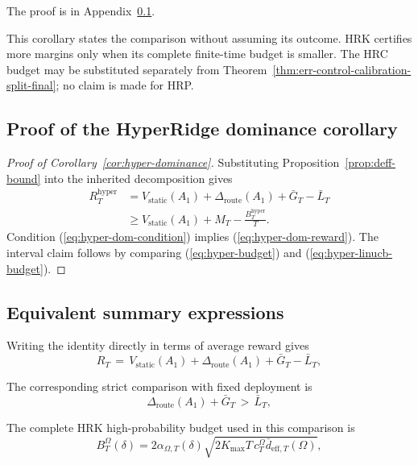 \documentclass{article} %
\renewcommand{\eqref}[1]{\textup{(\ref{#1})}}
\begin{document}
The proof is in Appendix~\ref{app:proof-hyper-dominance}.

This corollary states the comparison without assuming its outcome. HRK certifies more margins only when its complete finite-time budget is smaller. The HRC budget may be substituted separately from Theorem~\ref{thm:err-control-calibration-split-final}; no claim is made for HRP.

\subsection{Proof of the HyperRidge dominance corollary}
\label{app:proof-hyper-dominance}

\begin{proof}[Proof of Corollary~\ref{cor:hyper-dominance}]
Substituting Proposition~\ref{prop:deff-bound} into the inherited decomposition gives
\begin{equation}
\label{eq:hyper-cor-proof}
\begin{aligned}
R_T^{\mathrm{hyper}}
&=
V_{\mathrm{static}}(A_1)
+
\Delta_{\mathrm{route}}(A_1)
+
\bar G_T
-
\bar L_T
\\
&\ge
V_{\mathrm{static}}(A_1)
+
M_T
-
\frac{B_T^{\mathrm{hyper}}}{T}.
\end{aligned}
\end{equation}
Condition \eqref{eq:hyper-dom-condition} implies \eqref{eq:hyper-dom-reward}. The interval claim follows by comparing \eqref{eq:hyper-budget} and \eqref{eq:hyper-linucb-budget}.
\end{proof}

\subsection{Equivalent summary expressions}

Writing the identity directly in terms of average reward gives
\begin{equation}
\label{eq:intro-decomp}
R_T
\,=\,
V_{\mathrm{static}}(A_1)
+
\Delta_{\mathrm{route}}(A_1)
+
\bar G_T
-
\bar L_T ,
\end{equation}

The corresponding strict comparison with fixed deployment is
\begin{equation}
\label{eq:intro-dominance}
\Delta_{\mathrm{route}}(A_1) + \bar G_T \,>\, \bar L_T ,
\end{equation}

The complete HRK high-probability budget used in this comparison is
\begin{equation}
\label{eq:intro-hyper-cost}
B_T^\Omega(\delta)
=
2\alpha_{\Omega,T}(\delta)
\sqrt{2K_{\max}T\,c_T^\Omega\bar d_{\mathrm{eff},T}(\Omega)},
\end{equation}
\end{document}
